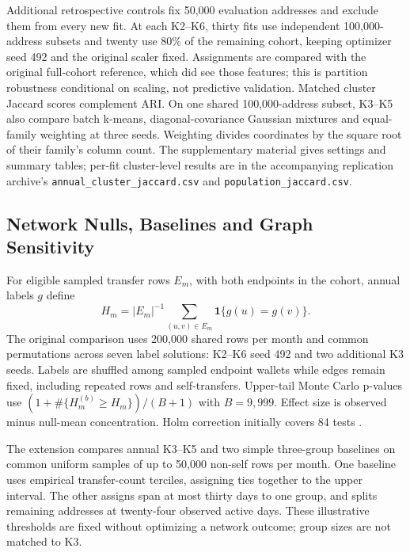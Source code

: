 \documentclass[journal,letterpaper]{IEEEtran}
\begin{document}
Additional retrospective controls fix 50,000 evaluation addresses and exclude them from every new fit. At each K2--K6, thirty fits use independent 100,000-address subsets and twenty use 80\% of the remaining cohort, keeping optimizer seed 492 and the original scaler fixed. Assignments are compared with the original full-cohort reference, which did see those features; this is partition robustness conditional on scaling, not predictive validation. Matched cluster Jaccard scores complement ARI. On one shared 100,000-address subset, K3--K5 also compare batch k-means, diagonal-covariance Gaussian mixtures and equal-family weighting at three seeds. Weighting divides coordinates by the square root of their family's column count. The supplementary material gives settings and summary tables; per-fit cluster-level results are in the accompanying replication archive's \texttt{annual\_cluster\_jaccard.csv} and \texttt{population\_jaccard.csv}.

\subsection{Network Nulls, Baselines and Graph Sensitivity}
For eligible sampled transfer rows $E_m$, with both endpoints in the cohort, annual labels $g$ define
\begin{equation}
H_m=|E_m|^{-1}\sum_{(u,v)\in E_m}\mathbf{1}\{g(u)=g(v)\}.
\end{equation}
The original comparison uses 200,000 shared rows per month and common permutations across seven label solutions: K2--K6 seed 492 and two additional K3 seeds. Labels are shuffled among sampled endpoint wallets while edges remain fixed, including repeated rows and self-transfers. Upper-tail Monte Carlo p-values use $(1+\#\{H_m^{(b)}\ge H_m\})/(B+1)$ with $B=9,999$. Effect size is observed minus null-mean concentration. Holm correction initially covers 84 tests \cite{holm1979sequential}.

The extension compares annual K3--K5 and two simple three-group baselines on common uniform samples of up to 50,000 non-self rows per month. One baseline uses empirical transfer-count terciles, assigning ties together to the upper interval. The other assigns span at most thirty days to one group, and splits remaining addresses at twenty-four observed active days. These illustrative thresholds are fixed without optimizing a network outcome; group sizes are not matched to K3.
\end{document}
